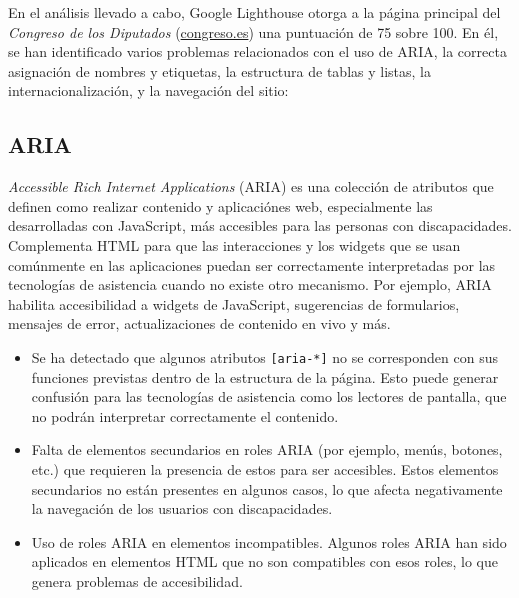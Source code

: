 \documentclass[]{article}
\begin{document}
En el análisis llevado a cabo, Google Lighthouse otorga a la página principal del \textit{Congreso de los Diputados} (\href{https://www.congreso.es/es/home}{congreso.es}) una puntuación de 75 sobre 100. En él, se han identificado varios problemas relacionados con el uso de ARIA, la correcta asignación de nombres y etiquetas, la estructura de tablas y listas, la internacionalización, y la navegación del sitio:

\subsection*{ARIA}
\textit{Accessible Rich Internet Applications} (ARIA) es una colección de atributos que definen como realizar contenido y aplicaciónes web, especialmente las desarrolladas con JavaScript, más accesibles para las personas con discapacidades. Complementa HTML para que las interacciones y los widgets que se usan comúnmente en las aplicaciones puedan ser correctamente interpretadas por las tecnologías de asistencia cuando no existe otro mecanismo. Por ejemplo, ARIA habilita accesibilidad a widgets de JavaScript, sugerencias de formularios, mensajes de error, actualizaciones de contenido en vivo y más.
\begin{itemize}
	\item Se ha detectado que algunos atributos \texttt{[aria-*]} no se corresponden con sus funciones previstas dentro de la estructura de la página. Esto puede generar confusión para las tecnologías de asistencia como los lectores de pantalla, que no podrán interpretar correctamente el contenido.
	
	\item Falta de elementos secundarios en roles ARIA (por ejemplo, menús, botones, etc.) que requieren la presencia de estos para ser accesibles. Estos elementos secundarios no están presentes en algunos casos, lo que afecta negativamente la navegación de los usuarios con discapacidades.
	
	\item Uso de roles ARIA en elementos incompatibles. Algunos roles ARIA han sido aplicados en elementos HTML que no son compatibles con esos roles, lo que genera problemas de accesibilidad.
\end{itemize}
\end{document}
